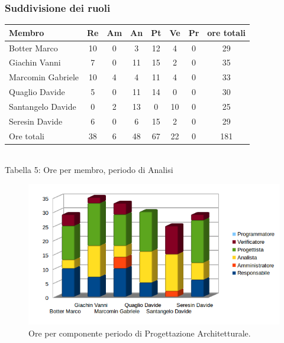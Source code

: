 \subsubsection{Suddivisione dei ruoli}
\begin{center}
\begin{tabular}{| l | c | c | c | c | c | c | c |}
\hline
Membro & Re & Am & An & Pt & Ve & Pr & ore totali \\
\hline
Botter Marco & 10 & 0 & 3 & 12 & 4 & 0 & 29 \\

Giachin Vanni & 7 & 0 & 11 & 15 & 2 & 0 & 35 \\

Marcomin Gabriele & 10 & 4 & 4 & 11 & 4 & 0 & 33 \\

Quaglio Davide & 5 & 0 & 11 & 14 & 0 & 0 & 30 \\

Santangelo Davide & 0 & 2 & 13 & 0 & 10 & 0 & 25 \\

Seresin Davide & 6 & 0 & 6 & 15 & 2 & 0 & 29 \\
\hline
Ore totali & 38 & 6 & 48 & 67 & 22 & 0 & 181 \\
\hline
\end{tabular}
\\
Tabella 5: Ore per membro, periodo di Analisi
\end{center}
\begin{figure}[H] \centering \includegraphics[width=%
\textwidth]
{../modello/img/2.png} \caption{ Ore per componente periodo di Progettazione Architetturale.}
\end{figure}
